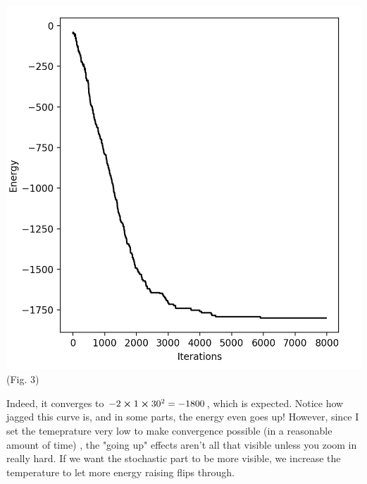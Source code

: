 \documentclass{article}
\begin{document}
\begin{center}
    \includegraphics[scale=.45]{energy_noMag.png}\\ 
    (Fig. 3)
\end{center}
Indeed, it converges to $-2\cross1\cross30^2=-1800$, which is expected. Notice how jagged this curve is, and in some parts, the energy even goes up! However, 
since I set the temeprature very low to make convergence possible (in a reasonable amount of time)
, the "going up" 
effects aren't all that visible unless you zoom in really hard. If we want 
the stochastic part to be more visible, we increase the temperature to let more energy raising flips through. 
\end{document}
